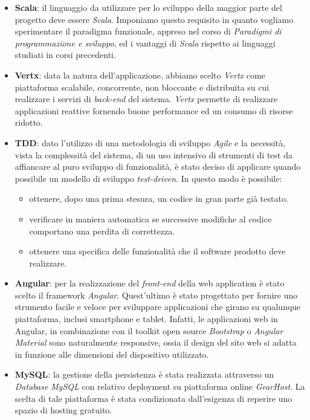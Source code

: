 \begin{itemize}
    \item \textbf{Scala}: il linguaggio da utilizzare per lo sviluppo della maggior parte del progetto deve essere \textit{Scala}. Imponiamo questo requisito in quanto vogliamo sperimentare il paradigma funzionale, appreso nel corso di \textit{Paradigmi di programmazione e sviluppo}, ed i vantaggi di \textit{Scala} rispetto ai linguaggi studiati in corsi precedenti.
    
    \item \textbf{Vertx}: data la natura dell'applicazione, abbiamo scelto \textit{Vertx} come piattaforma scalabile, concorrente, non bloccante e distribuita su cui realizzare i servizi di \textit{back-end} del sistema. \textit{Vertx} permette di realizzare applicazioni reattive fornendo buone performance ed un consumo di risorse ridotto.
    
    \item \textbf{TDD}: dato l'utilizzo di una metodologia di sviluppo \textit{Agile} e la necessità, vista la complessità del sistema, di un uso intensivo di strumenti di test da affiancare al puro sviluppo di funzionalità, è stato deciso di applicare quando possibile un modello di sviluppo \textit{test-driven}. In questo modo è possibile:
    \begin{itemize}
        \item ottenere, dopo una prima stesura, un codice in gran parte già testato.
        \item verificare in maniera automatica se successive modifiche al codice comportano una perdita di correttezza.
        \item ottenere una specifica delle funzionalità che il software prodotto deve realizzare.
    \end{itemize} 

    \item \textbf{Angular}: per la realizzazione del \textit{front-end} della web application è stato scelto il framework \textit{Angular}. Quest'ultimo è stato progettato per fornire uno strumento facile e veloce per sviluppare applicazioni che girano su qualunque piattaforma, inclusi smartphone e tablet. Infatti, le applicazioni web in Angular, in combinazione con il toolkit open source \textit{Bootstrap} o \textit{Angular Material} sono naturalmente responsive, ossia il design del sito web si adatta in funzione alle dimensioni del dispositivo utilizzato.
    
    \item \textbf{MySQL}: la gestione della persistenza è stata realizzata attraverso un \textit{Database} \textit{MySQL} con relativo deployment su piattaforma online \textit{GearHost}. La scelta di tale piattaforma è stata condizionata dall'esigenza di reperire uno spazio di hosting gratuito.
    
\end{itemize}
